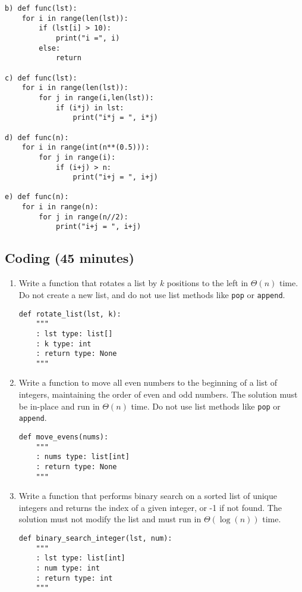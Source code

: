 \documentclass{article}
\begin{document}
\begin{enumerate}
\begin{verbatim}
b) def func(lst):
    for i in range(len(lst)):
        if (lst[i] > 10):
            print("i =", i)
        else:
            return

c) def func(lst):
    for i in range(len(lst)):
        for j in range(i,len(lst)):
            if (i*j) in lst:
                print("i*j = ", i*j)

d) def func(n):
    for i in range(int(n**(0.5))):
        for j in range(i):
            if (i+j) > n:
                print("i+j = ", i+j)

e) def func(n):
    for i in range(n):
        for j in range(n//2):
            print("i+j = ", i+j)
    \end{verbatim}
\end{enumerate}

\subsection*{Coding (45 minutes)}

\begin{enumerate}
    \item Write a function that rotates a list by $k$ positions to the left in $\Theta(n)$ time. Do not create a new list, and do not use list methods like \texttt{pop} or \texttt{append}.
    \begin{verbatim}
def rotate_list(lst, k):
    """
    : lst type: list[]
    : k type: int
    : return type: None
    """
    \end{verbatim}
    \item Write a function to move all even numbers to the beginning of a list of integers, maintaining the order of even and odd numbers. The solution must be in-place and run in $\Theta(n)$ time. Do not use list methods like \texttt{pop} or \texttt{append}.
    \begin{verbatim}
def move_evens(nums):
    """
    : nums type: list[int]
    : return type: None
    """
    \end{verbatim}
    \item Write a function that performs binary search on a sorted list of unique integers and returns the index of a given integer, or -1 if not found. The solution must not modify the list and must run in $\Theta(\log(n))$ time.
    \begin{verbatim}
def binary_search_integer(lst, num):
    """
    : lst type: list[int]
    : num type: int
    : return type: int
    """
    \end{verbatim}
\end{enumerate}
\end{document}
